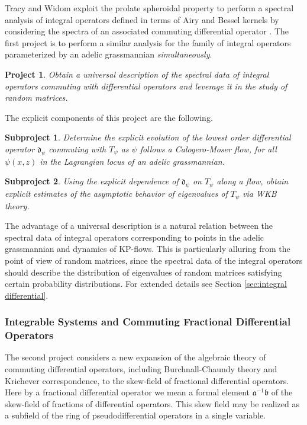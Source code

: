 \documentclass[11pt,letterpaper]{article}
\newtheorem{goal}{Project}
\newtheorem{subgoal}{Subproject}[goal]
\theoremstyle{definition}
\begin{document}
Tracy and Widom exploit the prolate spheroidal property to perform a spectral analysis of integral operators defined in terms of Airy and Bessel kernels by considering the spectra of an associated commuting differential operator \cite{TW1,TW2}.
The first project is to perform a similar analysis for the family of integral operators parameterized by an adelic grassmannian \emph{simultaneously}.
\begin{goal}
Obtain a universal description of the spectral data of integral operators commuting with differential operators and leverage it in the study of random matrices.
\end{goal}
\noindent The explicit components of this project are the following.
\begin{subgoal}
Determine the explicit evolution of the lowest order differential operator $\mathfrak d_\psi$ commuting with $T_\psi$ as $\psi$ follows a Calogero-Moser flow, for all $\psi(x,z)$ in the Lagrangian locus of an adelic grassmannian.
\end{subgoal}
\begin{subgoal}
Using the explicit dependence of $\mathfrak d_\psi$ on $T_\psi$ along a flow, obtain explicit estimates of the asymptotic behavior of eigenvalues of $T_\psi$ via WKB theory.
\end{subgoal}
The advantage of a universal description is a natural relation between the spectral data of integral operators corresponding to points in the adelic grassmannian and dynamics of KP-flows.
This is particularly alluring from the point of view of random matrices, since the spectral data of the integral operators should describe the distribution of eigenvalues of random matrices satisfying certain probability distributions.
For extended details see Section \ref{sec:integral differential}.


\subsubsection*{Integrable Systems and Commuting Fractional Differential Operators}
The second project considers a new expansion of the algebraic theory of commuting differential operators, including Burchnall-Chaundy theory and Krichever correspondence, to the skew-field of fractional differential operators.
Here by a fractional differential operator we mean a formal element $\mathfrak a^{-1}\mathfrak b$ of the skew-field of fractions of differential operators.
This skew field may be realized as a subfield of the ring of pseudodifferential operators in a single variable.
\end{document}

